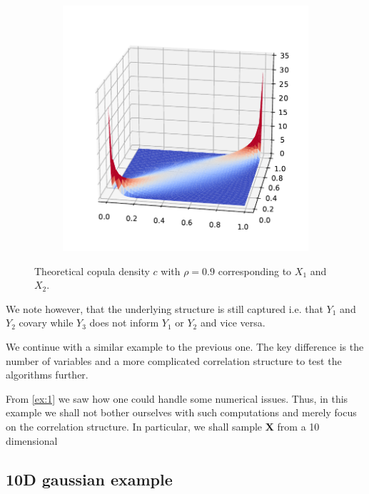 \documentclass[../Thesis.tex]{subfiles}
\begin{document}
\begin{figure}[H]
\begin{subfigure}[t]{0.49\linewidth}
        \includegraphics[width = \linewidth]{figures/ND examples/Gaussian copula theoretical pdf.pdf}
        \caption{}
    \end{subfigure}
    \caption{Theoretical copula density $c$ with $\rho = 0.9$ corresponding to $X_1$ and $X_2$.}
    \label{fig:gaussian copula truth}
\end{figure}
We note however, that the underlying structure is still captured i.e. that $Y_1$ and $Y_2$ covary while $Y_3$ does not inform $Y_1$ or $Y_2$ and vice versa.


We continue with a similar example to the previous one. The key difference is the number of variables and a more complicated correlation structure to test the algorithms further.
\begin{example}
    From \autoref{ex:1} we saw how one could handle some numerical issues. Thus, in this example we shall not bother ourselves with such computations and merely focus on the correlation structure. In particular, we shall sample $\boldsymbol X$ from a 10 dimensional
\end{example}


\newpage


\subsection{10D gaussian example}\label{sec:Gaussian network MI example - computation}
\end{document}
